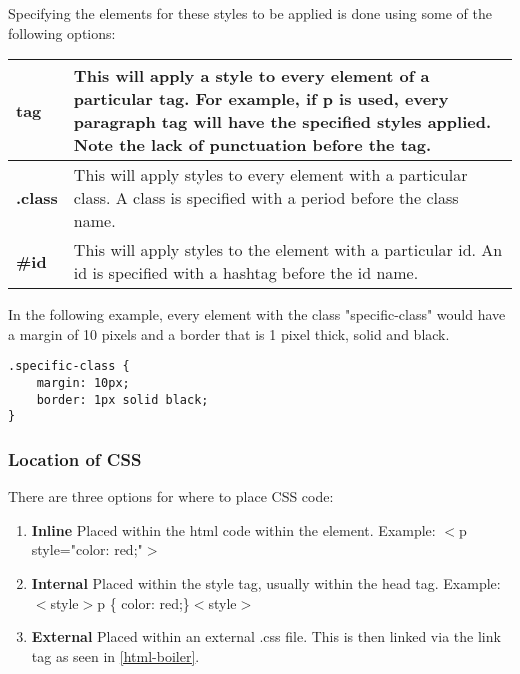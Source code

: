 \documentclass[12pt]{report}
\begin{document}
			\vspace{0.5cm}
				Specifying the elements for these styles to be applied is done using some of the following options: \\


					\vspace{0.5cm}
					{\centering
						\begin{tabular}{P{4cm}p{11cm}}
							\toprule[1.5pt]
							\textbf{tag} & This will apply a style to every element of a particular tag. For example, if p is used, every paragraph tag will have the specified styles applied. Note the lack of punctuation before the tag. \\
							\midrule
							\textbf{.class} &  This will apply styles to every element with a particular class. A class is specified with a period before the class name. \\
							\midrule
							\textbf{\#id} &  This will apply styles to the element with a particular id. An id is specified with a hashtag before the id name. \\
							\bottomrule[1.5pt]
						\end{tabular}
					}

					\vspace{0.8cm}

					In the following example, every element with the class "specific-class" would have a margin of 10 pixels and a border that is 1 pixel thick, solid and black.\\

					\vspace{0.2cm}
					\begin{lstlisting}
.specific-class {
	margin: 10px;
	border: 1px solid black;
}
					\end{lstlisting}
					\vspace{0.2cm}

				\subsubsection{Location of CSS}
					There are three options for where to place CSS code:\\

					\begin{enumerate}
						\item \textbf{Inline}
							Placed within the html code within the element. Example: $<$p style="color: red;"$>$
						\item \textbf{Internal}
							Placed within the style tag, usually within the head tag. Example:  $<$style$>$p \{ color: red;\}$<$style$>$
						\item \textbf{External}
							Placed within an external .css file. This is then linked via the link tag as seen in \ref{html-boiler}.
					\end{enumerate}
\end{document}
